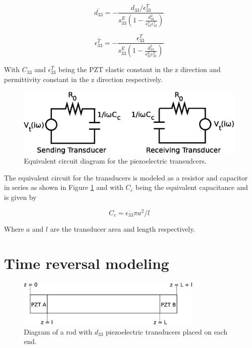 \begin{equation}
\overline{d_{33}} = -\frac{d_{33} / \epsilon ^T_{33}}{s^E_{33}(1 - \frac{d^2_{33}}{s^E_{33}\epsilon ^T_{33}})}
\end{equation}

\begin{equation}
\overline{\epsilon ^T_{33}} = -\frac{\epsilon ^T_{33}}{s^E_{33}(1 - \frac{d^2_{33}}{s^E_{33}\epsilon ^T_{33}})}
\end{equation}

With $C_{33}$ and $\epsilon ^T_{33}$ being the PZT elastic constant in the z direction and permittivity constant in the z direction respectively.

\begin{figure}[ht!]
\centering
\includegraphics[width=1\textwidth]{eps_pics/trans_circ}
\caption{Equivalent circuit diagram for the piezoelectric transudcers.
	 \label{fig:trans_circ}} 
\end{figure}

The equivalent circuit for the transducers is modeled as a resistor and capacitor in series as shown in Figure \ref{fig:trans_circ} and with $C_c$ being the equivalent capacitance and is given by

\begin{equation}
C_c = \overline{\epsilon_{33}} \pi a^2/l
\end{equation}

Where $a$ and $l$ are the transducer area and length respectively.

\section{Time reversal modeling}

\begin{figure}[ht!]
\centering
\includegraphics[width=0.8\textwidth]{eps_pics/rodTrans.eps}
\caption{Diagram of a rod with $d_{33}$ piezoelectric transducers placed on each end.
	 \label{fig:rodTrans}} 
\end{figure}